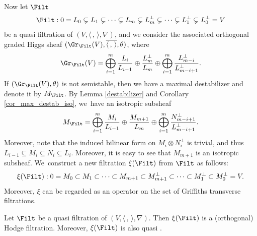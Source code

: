 Now let $\Filt$
\[
\Filt: 0= L_0 \subsetneq L_1 \subsetneq \cdots \subsetneq L_m \subsetneq L_m^\perp\subsetneq\cdots \subsetneq L_1^\perp\subsetneq L_0^\perp= V
\]
be a quasi \grsemistable filtration of $(V,\langle \,, \, \rangle,\nabla)$, and we consider the associated orthogonal graded Higgs sheaf $(\Gr_{\Filt}(V), \overline{\langle \,, \, \rangle},\theta)$, where
\[
\Gr_{\Filt}(V)=\mathop{\bigoplus}_{i=1}^{m} \frac{L_i}{L_{i-1}}\oplus \frac{L_m^\perp}{L_m}\oplus \mathop{\bigoplus}_{i=1}^{m} \frac{L_{m-i}^\perp}{L_{m-i+1}^\perp}.
\]
If $(\Gr_{\Filt}(V),\theta)$ is not semistable, then we have a maximal destabilizer and denote it by $M_{\Filt}$. By Lemma \ref{destabilizer} and Corollary \ref{cor_max_destab_iso}, we~have an isotropic subsheaf
\[
M_{\Filt}=\mathop{\bigoplus}_{i=1}^{m} \frac{M_i}{L_{i-1}}\oplus \frac{M_{m+1}}{L_m}\oplus \mathop{\bigoplus}_{i=1}^{m} \frac{N_{m-i+1}^\perp}{L_{m-i+1}^\perp}.
\]
Moreover, note that the induced bilinear form on $M_i \otimes N_i^{\perp}$ is trivial, and thus $L_{i-1} \subseteq M_i \subseteq N_i \subseteq L_i$. Moreover, it is easy to see that $M_{m+1}$ is an isotropic subsheaf. We~construct a new filtration $\xi(\Filt)$ from $\Filt$ as follows:
\[
\xi(\Filt):0=M_0\subset M_1\subset\cdots\subset M_{m+1}\subset M_{m+1}^\perp\subset\cdots\subset M_1^\perp\subset M_0^\perp=V.
\]
Moreover, $\xi$ can be regarded as an operator on the set of Griffiths transverse filtrations.

\begin{lem}\label{preserve}
Let $\Filt$ be a quasi \grsemistable filtration of $(V, \langle \,, \, \rangle, \nabla)$. Then $\xi(\Filt)$ is a (orthogonal) Hodge filtration. Moreover, $\xi(\Filt)$ is also quasi \grsemistable.
\end{lem}

